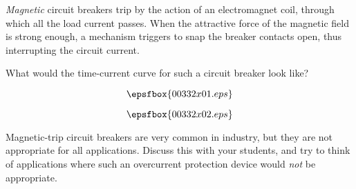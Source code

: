 

{\it Magnetic} circuit breakers trip by the action of an electromagnet coil, through which all the load current passes.  When the attractive force of the magnetic field is strong enough, a mechanism triggers to snap the breaker contacts open, thus interrupting the circuit current.

What would the time-current curve for such a circuit breaker look like?

$$\epsfbox{00332x01.eps}$$







$$\epsfbox{00332x02.eps}$$







Magnetic-trip circuit breakers are very common in industry, but they are not appropriate for all applications.  Discuss this with your students, and try to think of applications where such an overcurrent protection device would {\it not} be appropriate.




